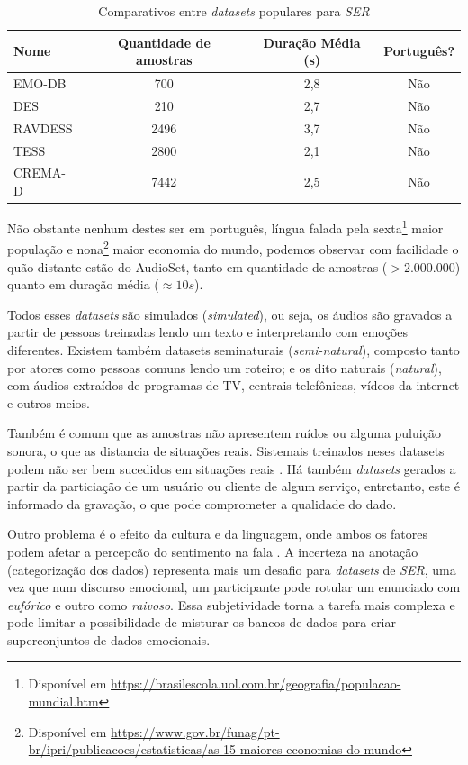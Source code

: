 \begin{table}[!ht]\label{table:comparativodbs}
\centering
\caption{Comparativos entre \textit{datasets} populares para \textit{SER}}
    \begin{tabular}{|l|c|c|c|}
    \hline
        Nome & Quantidade de amostras & Duração Média (s) & Português?  \\ \hline
        EMO-DB  & 700 & 2,8 & Não  \\ \hline
        DES  & 210 & 2,7 & Não  \\ \hline
        RAVDESS  & 2496 & 3,7 & Não  \\ \hline
        TESS  & 2800 & 2,1 & Não  \\ \hline
        CREMA-D  & 7442 & 2,5 & Não  \\ \hline
    \end{tabular}
\end{table}

Não obstante nenhum destes ser em português, língua falada pela sexta\footnote{Disponível em \url{https://brasilescola.uol.com.br/geografia/populacao-mundial.htm}} maior população e nona\footnote{Disponível em \url{https://www.gov.br/funag/pt-br/ipri/publicacoes/estatisticas/as-15-maiores-economias-do-mundo}} maior economia do mundo, podemos observar com facilidade o quão distante estão do AudioSet, tanto em quantidade de amostras ($> 2.000.000$) quanto em duração média ($\approx 10s$).

Todos esses \textit{datasets} são simulados (\textit{simulated}), ou seja, os áudios são gravados a partir de pessoas treinadas lendo um texto e interpretando com emoções diferentes. Existem também datasets seminaturais (\textit{semi-natural}), composto tanto por atores como pessoas comuns lendo um roteiro; e os dito naturais (\textit{natural}), com áudios extraídos de programas de TV, centrais telefônicas, vídeos da internet e outros meios.

Também é comum que as amostras não apresentem ruídos ou alguma puluição sonora, o que as distancia de situações reais. Sistemais treinados neses datasets podem não ser bem sucedidos em situações reais \cite{32}. Há também \textit{datasets} gerados a partir da particiação de um usuário ou cliente de algum serviço, entretanto, este é informado da gravação, o que pode comprometer a qualidade do dado.

Outro problema é o efeito da cultura e da linguagem, onde ambos os fatores podem afetar a percepcão do sentimento na fala \cite{32}. A incerteza na anotação (categorização dos dados) representa mais um desafio para \textit{datasets} de \textit{SER}, uma vez que num discurso emocional, um participante pode rotular um enunciado com \textit{eufórico} e outro como \textit{raivoso}. Essa subjetividade torna a tarefa mais complexa e pode limitar a possibilidade de misturar os bancos de dados para criar superconjuntos de dados emocionais.

